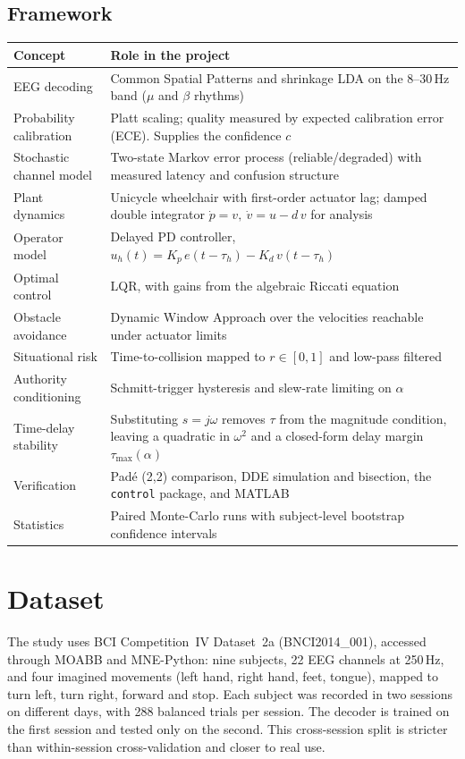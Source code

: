 \documentclass[11pt,a4paper]{article}
\begin{document}
\subsection*{Framework}
{\small\noindent
\begin{tabularx}{\textwidth}{@{}p{4.1cm}L@{}}
\toprule
\textbf{Concept} & \textbf{Role in the project} \\
\midrule
EEG decoding & Common Spatial Patterns and shrinkage LDA on the 8--30\,Hz band ($\mu$ and $\beta$ rhythms) \\
Probability calibration & Platt scaling; quality measured by expected calibration error (ECE). Supplies the confidence $c$ \\
Stochastic channel model & Two-state Markov error process (reliable/degraded) with measured latency and confusion structure \\
Plant dynamics & Unicycle wheelchair with first-order actuator lag; damped double integrator $\dot p = v,\ \dot v = u - d\,v$ for analysis \\
Operator model & Delayed PD controller, $u_h(t) = K_p\,e(t-\tau_h) - K_d\,v(t-\tau_h)$ \\
Optimal control & LQR, with gains from the algebraic Riccati equation \\
Obstacle avoidance & Dynamic Window Approach over the velocities reachable under actuator limits \\
Situational risk & Time-to-collision mapped to $r \in [0,1]$ and low-pass filtered \\
Authority conditioning & Schmitt-trigger hysteresis and slew-rate limiting on $\alpha$ \\
Time-delay stability & Substituting $s=j\omega$ removes $\tau$ from the magnitude condition, leaving a quadratic in $\omega^2$ and a closed-form delay margin $\tau_{\max}(\alpha)$ \\
Verification & Pad\'e (2,2) comparison, DDE simulation and bisection, the \texttt{control} package, and MATLAB \\
Statistics & Paired Monte-Carlo runs with subject-level bootstrap confidence intervals \\
\bottomrule
\end{tabularx}\par}

\section{Dataset}

The study uses BCI Competition~IV Dataset~2a (BNCI2014\_001), accessed through
MOABB and MNE-Python: nine subjects, 22 EEG channels at 250\,Hz, and four
imagined movements (left hand, right hand, feet, tongue), mapped to turn left,
turn right, forward and stop. Each subject was recorded in two sessions on
different days, with 288 balanced trials per session. The decoder is trained on
the first session and tested only on the second. This cross-session split is
stricter than within-session cross-validation and closer to real use.
\end{document}

